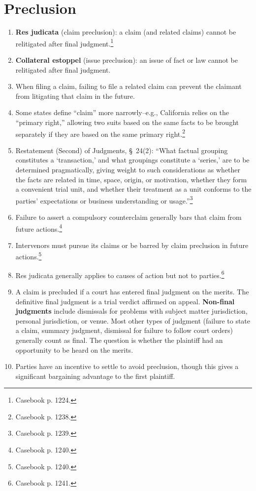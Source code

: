 \section{Preclusion}

\begin{enumerate}
    \item \textbf{Res judicata} (claim preclusion): a claim (and related 
    claims) cannot be relitigated after final judgment.\footnote{Casebook p.  
    1224.}
    \item \textbf{Collateral estoppel} (issue preclusion): an issue of fact or 
    law cannot be relitigated after final judgment.
    \item When filing a claim, failing to file a related claim can prevent the 
    claimant from litigating that claim in the future.
    \item Some states define ``claim'' more narrowly--e.g., California relies 
    on the ``primary right,'' allowing two suits based on the same facts to be 
    brought separately if they are based on the same primary 
    right.\footnote{Casebook p. 1238.}
    \item Restatement (Second) of Judgments, \S\ 24(2): ``What factual 
    grouping constitutes a `transaction,' and what groupings constitute a 
    `series,' are to be determined pragmatically, giving weight to such 
    considerations as whether the facts are related in time, space, origin, or 
    motivation, whether they form a convenient trial unit, and whether their 
    treatment as a unit conforms to the parties' expectations or business 
    understanding or usage.''\footnote{Casebook p. 1239.}
    \item Failure to assert a compulsory counterclaim generally bars that 
    claim from future actions.\footnote{Casebook p. 1240.}
    \item Intervenors must pursue its claims or be barred by claim preclusion 
    in future actions.\footnote{Casebook p. 1240.}
    \item Res judicata generally applies to causes of action but not to 
    parties.\footnote{Casebook p. 1241.}
    \item A claim is precluded if a court has entered final judgment on the 
    merits. The definitive final judgment is a trial verdict affirmed on 
    appeal. \textbf{Non-final judgments} include dismissals for problems with 
    subject matter jurisdiction, personal jurisdiction, or venue. Most other 
    types of judgment (failure to state a claim, summary judgment, dismissal 
    for failure to follow court orders) generally count as final. The question 
    is whether the plaintiff had an opportunity to be heard on the merits.
    \item Parties have an incentive to settle to avoid preclusion, though this 
    gives a significant bargaining advantage to the first plaintiff.
\end{enumerate}

